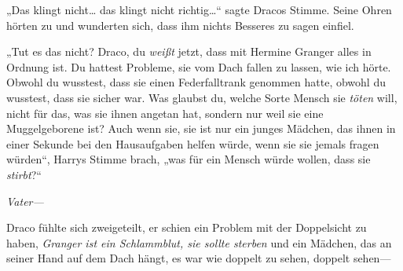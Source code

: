 „Das klingt nicht… das klingt nicht richtig…“ sagte Dracos Stimme. Seine Ohren hörten zu und wunderten sich, dass ihm nichts Besseres zu sagen einfiel.

„Tut es das nicht? Draco, du \emph{weißt} jetzt, dass mit Hermine Granger alles in Ordnung ist. Du hattest Probleme, sie vom Dach fallen zu lassen, wie ich hörte. Obwohl du wusstest, dass sie einen Federfalltrank genommen hatte, obwohl du wusstest, dass sie sicher war. Was glaubst du, welche Sorte Mensch sie \emph{töten} will, nicht für das, was sie ihnen angetan hat, sondern nur weil sie eine Muggelgeborene ist? Auch wenn sie, sie ist nur ein junges Mädchen, das ihnen in einer Sekunde bei den Hausaufgaben helfen würde, wenn sie sie jemals fragen würden“, Harrys Stimme brach, „was für ein Mensch würde wollen, dass sie \emph{stirbt}?“

\emph{Vater—}

Draco fühlte sich zweigeteilt, er schien ein Problem mit der Doppelsicht zu haben, \emph{Granger ist ein Schlammblut, sie sollte sterben} und ein Mädchen, das an seiner Hand auf dem Dach hängt, es war wie doppelt zu sehen, doppelt sehen—


